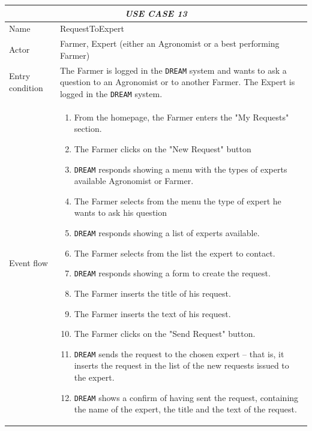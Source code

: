 \documentclass{article}
\begin{document}
\centering
\begin{longtable}{|p{3.5cm}|m{8cm}|}
 \hline
 \multicolumn{2}{|c|}{\cellcolor{white}\emph{USE CASE 13}} \\
 \endfirsthead
 \endhead
 \endfoot
 \endlastfoot
 \hline
 Name & RequestToExpert\\
 \hline
 Actor & Farmer, Expert (either an Agronomist or a best performing Farmer)\\
 \hline
 Entry condition & The Farmer is logged in the \verb|DREAM| system and wants to ask a question to an Agronomist or to another Farmer.
The Expert is logged in the \verb|DREAM| system.\\
 \hline
 Event flow & \begin{enumerate}
    \item From the homepage, the Farmer enters the "My Requests" section.
    \item The Farmer clicks on the "New Request" button
    \item \verb|DREAM| responds showing a menu with the types of experts available
        Agronomist or Farmer.
    \item The Farmer selects from the menu the type of expert he wants to ask his
        question  
    \item \verb|DREAM| responds showing a list of experts available.
    \item The Farmer selects from the list the expert to contact.
    \item \verb|DREAM| responds showing a form to create the request.
    \item The Farmer inserts the title of his request.
    \item The Farmer inserts the text of his request.
    \item The Farmer clicks on the "Send Request" button.
    \item \verb|DREAM| sends the request to the chosen expert – that is, it inserts the request in the list of the new requests issued to the expert.
    \item \verb|DREAM| shows a confirm of having sent the request, containing the name of the expert, the title and the text of the request.
    

\end{enumerate}
\end{longtable}
\end{document}
